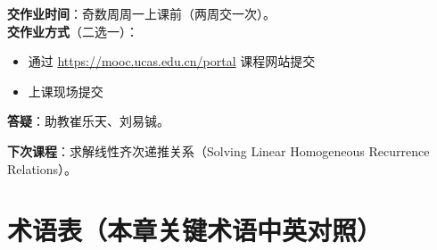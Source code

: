 \documentclass[UTF8,11pt,a4paper]{ctexbook}   %
\theoremstyle{definition}
\begin{document}
\textbf{交作业时间}：奇数周周一上课前（两周交一次）。\\
\textbf{交作业方式}（二选一）：
\begin{itemize}
    \item 通过 \url{https://mooc.ucas.edu.cn/portal} 课程网站提交
    \item 上课现场提交
\end{itemize}
\textbf{答疑}：助教崔乐天、刘易铖。

\textbf{下次课程}：求解线性齐次递推关系（Solving Linear Homogeneous Recurrence Relations）。

\newpage
\section*{术语表（本章关键术语中英对照）}
\end{document}
